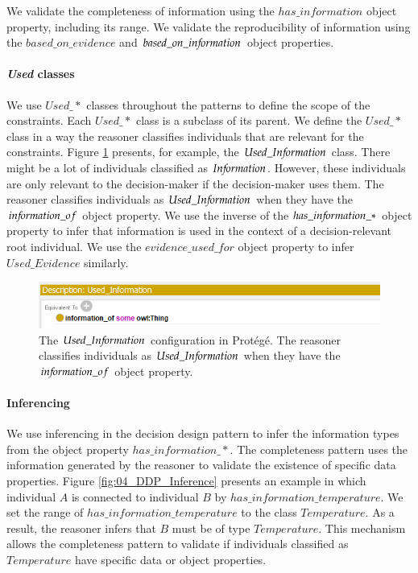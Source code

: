 We validate the completeness of information using the $has\_information$ object property, including its range. We validate the reproducibility of information using the $based\_on\_evidence$ and $based\_on\_in{\mkern-2mu f\mkern-3mu}ormation$ object properties.

\paragraph{\emph{Used} classes}
We use $Used\_*$ classes throughout the patterns to define the scope of the constraints. Each $Used\_*$ class is a subclass of its parent. We define the $Used\_*$ class in a way the reasoner classifies individuals that are relevant for the constraints. Figure \ref{fig:04_Used_Information} presents, for example, the $Used\_In{\mkern-2mu f\mkern-3mu}ormation$ class. There might be a lot of individuals classified as $In{\mkern-2mu f\mkern-3mu}ormation$. However, these individuals are only relevant to the decision-maker if the decision-maker uses them. The reasoner classifies individuals as $Used\_In{\mkern-2mu f\mkern-3mu}ormation$ when they have the $in{\mkern-2mu f\mkern-3mu}ormation\_of$ object property. We use the inverse of the $has\_in{\mkern-2mu f\mkern-3mu}ormation\_*$ object property to infer that information is used in the context of a decision-relevant root individual. We use the $evidence\_used\_for$ object property to infer $Used\_Evidence$ similarly.  

\begin{figure}[H]
\centering
  \includegraphics[width=12cm]{../../Images/04_Contribution/04_Used_Information.png}
  \caption{The $Used\_In{\mkern-2mu f\mkern-3mu}ormation$ configuration in Prot\'eg\'e. The reasoner classifies individuals as $Used\_In{\mkern-2mu f\mkern-3mu}ormation$ when they have the $in{\mkern-2mu f\mkern-3mu}ormation\_of$ object property.}
  \label{fig:04_Used_Information}
\end{figure} 

\paragraph{Inferencing}
We use inferencing in the decision design pattern to infer the information types from the object property $has\_information\_*$. The completeness pattern uses the information generated by the reasoner to validate the existence of specific data properties. Figure \ref{fig:04_DDP_Inference} presents an example in which individual $A$ is connected to individual $B$ by $has\_information\_temperature$. We set the range of $has\_information\_temperature$ to the class $Temperature$. As a result, the reasoner infers that $B$ must be of type $Temperature$. This mechanism allows the completeness pattern to validate if individuals classified as $Temperature$ have specific data or object properties.

